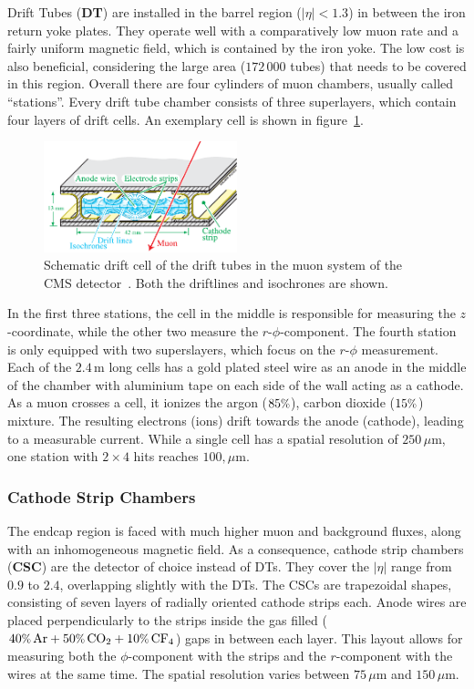 Drift Tubes (\textbf{DT}) are installed in the barrel region ($|\eta| < 1.3$) in between the iron return yoke plates. They operate well with a comparatively low muon rate and a fairly uniform magnetic field, which is contained by the iron yoke. The low cost is also beneficial, considering the large area ($172\,000$ tubes) that needs to be covered in this region. Overall there are four cylinders of muon chambers, usually called ``stations''. Every drift tube chamber consists of three superlayers, which contain four layers of drift cells. An exemplary cell is shown in figure~\ref{fig:drift-cell}.

\begin{figure}[!htb]
  \centering
  \includegraphics[width=0.5\textwidth]{plots/driftcell.pdf}  
  \caption{Schematic drift cell of the drift tubes in the muon system of the CMS detector~\cite{driftcell}. Both the driftlines and isochrones are shown.}
  \label{fig:drift-cell}
\end{figure}

In the first three stations, the cell in the middle is responsible for measuring the $z$-coordinate, while the other two measure the $r$-$\phi$-component. The fourth station is only equipped with two superslayers, which focus on the $r$-$\phi$ measurement. Each of the $2.4\,\text{m}$ long cells has a gold plated steel wire as an anode in the middle of the chamber with aluminium tape on each side of the wall acting as a cathode. As a muon crosses a cell, it ionizes the argon ($85\pct$), carbon dioxide ($15\pct$) mixture. The resulting electrons (ions) drift towards the anode (cathode), leading to a measurable current. While a single cell has a spatial resolution of $250\,\mu\text{m}$, one station with $2 \times 4$ hits reaches $100,\mu\text{m}$.

\subsubsection{Cathode Strip Chambers}

The endcap region is faced with much higher muon and background fluxes, along with an inhomogeneous magnetic field. As a consequence, cathode strip chambers (\textbf{CSC}) are the detector of choice instead of DTs. They cover the $|\eta|$ range from $0.9$ to $2.4$, overlapping slightly with the DTs. The CSCs are trapezoidal shapes, consisting of seven layers of radially oriented cathode strips each. Anode wires are placed perpendicularly to the strips inside the gas filled ($40\pct\,\text{Ar} + 50\pct\,\text{CO}_2 + 10\pct\,\text{CF}_4$) gaps in between each layer. This layout allows for measuring both the $\phi$-component with the strips and the $r$-component with the wires at the same time. The spatial resolution varies between $75\,\mu\text{m}$ and $150\,\mu\text{m}$.

